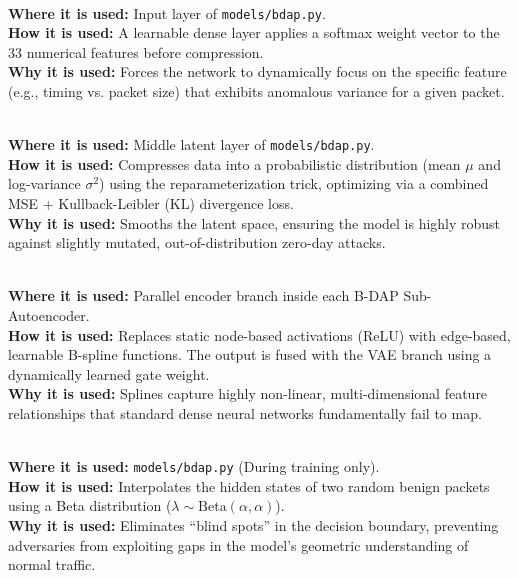 \documentclass[11pt,a4paper]{article}
\begin{document}
\begin{description}[style=unboxed, leftmargin=0cm]
    \item[\textcolor{primary}{1. AttentionGate (v2)}] \hfill \\
    \textbf{Where it is used:} Input layer of \texttt{models/bdap.py}. \\
    \textbf{How it is used:} A learnable dense layer applies a softmax weight vector to the 33 numerical features before compression. \\
    \textbf{Why it is used:} Forces the network to dynamically focus on the specific feature (e.g., timing vs. packet size) that exhibits anomalous variance for a given packet.

    \item[\textcolor{primary}{2. Variational Autoencoder (VAE) Bottleneck (v3)}] \hfill \\
    \textbf{Where it is used:} Middle latent layer of \texttt{models/bdap.py}. \\
    \textbf{How it is used:} Compresses data into a probabilistic distribution (mean $\mu$ and log-variance $\sigma^2$) using the reparameterization trick, optimizing via a combined MSE + Kullback-Leibler (KL) divergence loss. \\
    \textbf{Why it is used:} Smooths the latent space, ensuring the model is highly robust against slightly mutated, out-of-distribution zero-day attacks.

    \item[\textcolor{primary}{3. Kolmogorov-Arnold Networks (KAN) (v4)}] \hfill \\
    \textbf{Where it is used:} Parallel encoder branch inside each B-DAP Sub-Autoencoder. \\
    \textbf{How it is used:} Replaces static node-based activations (ReLU) with edge-based, learnable B-spline functions. The output is fused with the VAE branch using a dynamically learned gate weight. \\
    \textbf{Why it is used:} Splines capture highly non-linear, multi-dimensional feature relationships that standard dense neural networks fundamentally fail to map.

    \item[\textcolor{primary}{4. Manifold Mixup (v3)}] \hfill \\
    \textbf{Where it is used:} \texttt{models/bdap.py} (During training only). \\
    \textbf{How it is used:} Interpolates the hidden states of two random benign packets using a Beta distribution ($\lambda \sim \text{Beta}(\alpha, \alpha)$). \\
    \textbf{Why it is used:} Eliminates ``blind spots'' in the decision boundary, preventing adversaries from exploiting gaps in the model's geometric understanding of normal traffic.


\end{description}
\end{document}
